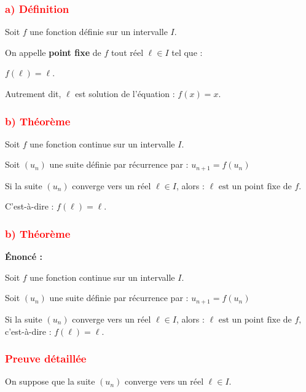 \documentclass[12pt,a4paper]{article}
\newcounter{solution}
\begin{document}
\subsubsection*{\textcolor{red}{a) Définition}}

Soit $f$ une fonction définie sur un intervalle $I$.

On appelle \textbf{point fixe} de $f$ tout réel $\ell \in I$ tel que :

\(
f(\ell) = \ell.
\)

Autrement dit, $\ell$ est solution de l’équation :
\(
f(x) = x.
\)

\vspace{0.3cm}

\subsubsection*{\textcolor{red}{b) Théorème}}

Soit $f$ une fonction continue sur un intervalle $I$.

Soit $(u_n)$ une suite définie par récurrence par :
\(
u_{n+1} = f(u_n)
\)

Si la suite $(u_n)$ converge vers un réel $\ell \in I$, alors :
\(
\ell \text{ est un point fixe de } f.
\)

C’est-à-dire :
\(
f(\ell) = \ell.
\)

\vspace{0.3cm}

\subsubsection*{\textcolor{red}{b) Théorème}}

\textbf{Énoncé :}

Soit $f$ une fonction continue sur un intervalle $I$.

Soit $(u_n)$ une suite définie par récurrence par :
\(
u_{n+1} = f(u_n)
\)

Si la suite $(u_n)$ converge vers un réel $\ell \in I$, alors :
\(
\ell \text{ est un point fixe de } f,
\)
c'est-à-dire :
\(
f(\ell)=\ell.
\)

\bigskip

\subsubsection*{\textcolor{red}{Preuve détaillée}}

On suppose que la suite $(u_n)$ converge vers un réel $\ell \in I$.
\end{document}
